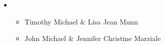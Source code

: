 \documentclass[12pt]{article}
\begin{document}
\begin{minipage}[t]{0.495\textwidth}
\centering


\begin{itemize}

\item [] 

\begin{itemize}[topsep=-5pt,itemsep=-1ex,partopsep=1ex,parsep=1ex]
\item [] Timothy Michael \& Lisa Jean Munn
\item [] John Michael \& Jennifer Christine Marziale


\end{itemize}
\end{itemize}
\end{minipage}
\end{document}
